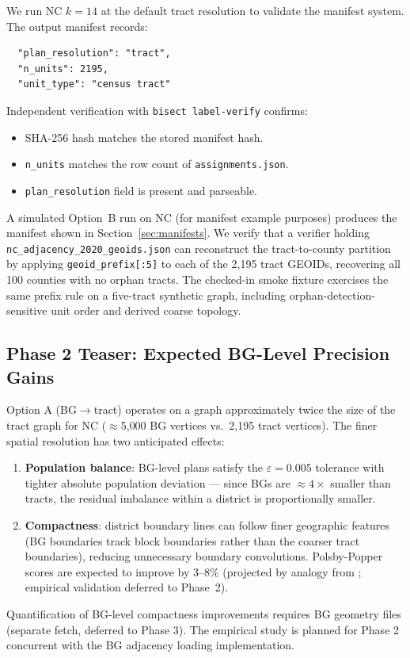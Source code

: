 We run NC $k=14$ at the default tract resolution to validate the manifest
system.
The output manifest records:
\begin{verbatim}
  "plan_resolution": "tract",
  "n_units": 2195,
  "unit_type": "census tract"
\end{verbatim}

\noindent
Independent verification with \texttt{bisect label-verify} confirms:
\begin{itemize}
  \item SHA-256 hash matches the stored manifest hash.
  \item \texttt{n\_units} matches the row count of \texttt{assignments.json}.
  \item \texttt{plan\_resolution} field is present and parseable.
\end{itemize}

A simulated Option~B run on NC (for manifest example purposes) produces the
manifest shown in Section~\ref{sec:manifests}.
We verify that a verifier holding \texttt{nc\_adjacency\_2020\_geoids.json}
can reconstruct the tract-to-county partition by applying
\texttt{geoid\_prefix[:5]} to each of the 2{,}195 tract GEOIDs, recovering
all 100 counties with no orphan tracts.
The checked-in smoke fixture exercises the same prefix rule on a five-tract
synthetic graph, including orphan-detection-sensitive unit order and derived
coarse topology.

\subsection{Phase 2 Teaser: Expected BG-Level Precision Gains}

Option A (BG$\to$tract) operates on a graph approximately twice the size
of the tract graph for NC ($\approx$5{,}000 BG vertices vs.\ 2{,}195 tract
vertices).
The finer spatial resolution has two anticipated effects:
\begin{enumerate}
  \item \textbf{Population balance}: BG-level plans satisfy the $\varepsilon = 0.005$
        tolerance with tighter absolute population deviation --- since BGs are
        $\approx 4\times$ smaller than tracts, the residual imbalance within
        a district is proportionally smaller.
  \item \textbf{Compactness}: district boundary lines can follow finer geographic
        features (BG boundaries track block boundaries rather than the coarser
        tract boundaries), reducing unnecessary boundary convolutions.
        Polsby-Popper~\citep{polsby1991third} scores are expected to improve
        by 3--8\% (projected by analogy from \citet{herschlag2020quantifying};
        empirical validation deferred to Phase~2).
\end{enumerate}

Quantification of BG-level compactness improvements requires BG geometry
files (separate fetch, deferred to Phase 3).
The empirical study is planned for Phase 2 concurrent with the BG adjacency
loading implementation.
